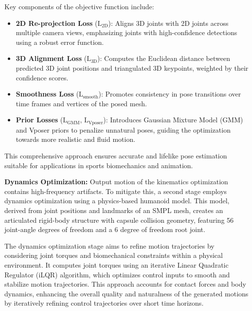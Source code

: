 \documentclass{egpubl}
\begin{document}
Key components of the objective function include:

\begin{itemize}
    \item \textbf{2D Re-projection Loss} ($\mathrm{L}_\text{2D}$): Aligns 3D joints with 2D joints across multiple camera views, emphasizing joints with high-confidence detections using a robust error function.
    \item \textbf{3D Alignment Loss} ($\mathrm{L}_\text{3D}$): Computes the Euclidean distance between predicted 3D joint positions and triangulated 3D keypoints, weighted by their confidence scores.
    \item \textbf{Smoothness Loss} ($\mathrm{L}_\text{smooth}$): Promotes consistency in pose transitions over time frames and vertices of the posed mesh.
    \item \textbf{Prior Losses} ($\mathrm{L}_{\text{GMM}}$, $\mathrm{L}_{\text{Vposer}}$): Introduces Gaussian Mixture Model (GMM) and Vposer priors to penalize unnatural poses, guiding the optimization towards more realistic and fluid motion.
\end{itemize}
 This comprehensive approach ensures accurate and lifelike pose estimation suitable for applications in sports biomechanics and animation.


\textbf{Dynamics Optimization:} Output motion of the kinematics optimization contains high-frequency artifacts. To mitigate this, a second stage employs dynamics optimization using a physics-based humanoid model. This model, derived from joint positions and landmarks of an SMPL mesh, creates an articulated rigid-body structure with capsule collision geometry, featuring 56 joint-angle degrees of freedom and a 6 degree of freedom root joint.

The dynamics optimization stage aims to refine motion trajectories by considering joint torques and biomechanical constraints within a physical environment. It computes joint torques using an iterative Linear Quadratic Regulator (iLQR) algorithm, which optimizes control inputs to smooth and stabilize motion trajectories. This approach accounts for contact forces and body dynamics, enhancing the overall quality and naturalness of the generated motions by iteratively refining control trajectories over short time horizons.



 
 
\end{document}
